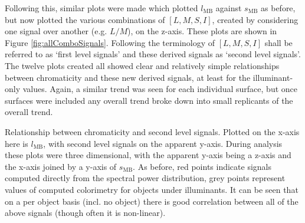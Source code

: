 \bigskip

Following this, similar plots were made which plotted $l_{\text{MB}}$ against $s_{\text{MB}}$ as before, but now plotted the various combinations of $[L,M,S,I]$, created by considering one signal over another (e.g. $L/M$), on the z-axis. These plots are shown in Figure \ref{fig:allComboSignals}. Following the terminology of \citet{barrionuevo_contributions_2014} $[L,M,S,I]$ shall be referred to as `first level signals' and these derived signals as `second level signals'. The twelve plots created all showed clear and relatively simple relationships between chromaticity and these new derived signals, at least for the illuminant-only values. Again, a similar trend was seen for each individual surface, but once surfaces were included any overall trend broke down into small replicants of the overall trend.

% 


\begin{fullpagefigure}
\caption{Relationship between chromaticity and second level signals. Plotted on the x-axis here is $l_{\text{MB}}$, with second level signals on the apparent y-axis. During analysis these plots were three dimensional, with the apparent y-axis being a z-axis and the x-axis joined by a y-axis of $s_{\text{MB}}$. As before, red points indicate signals computed directly from the spectral power distribution, grey points represent values of computed colorimetry for objects under illuminants. It can be seen that on a per object basis (incl. no object) there is good correlation between all of the above signals (though often it is non-linear).}
\label{fig:allComboSignals}
\end{fullpagefigure}

